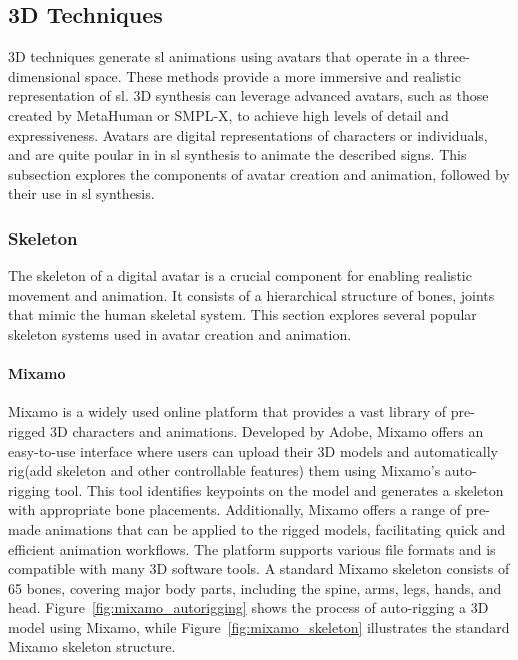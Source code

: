 \documentclass[../../main.tex]{subfiles}
\begin{document}
\subsection{3D Techniques}
\label{ch:background_work:sign_language_synthesis:3d_techniques}

3D techniques generate \gls{sl} animations using avatars that operate in a three-dimensional space. These methods provide a more immersive and realistic representation of \gls{sl}. 3D synthesis can leverage advanced avatars, such as those created by MetaHuman or SMPL-X, to achieve high levels of detail and expressiveness. Avatars are digital representations of characters or individuals, and are quite poular in in \gls{sl} synthesis to animate the described signs. This subsection explores the components of avatar creation and animation, followed by their use in \gls{sl} synthesis.

\subsubsection{Skeleton}
\label{ch:background_work:sign_language_synthesis:3d_techniques:skeleton}

The skeleton of a digital avatar is a crucial component for enabling realistic movement and animation. It consists of a hierarchical structure of bones, joints that mimic the human skeletal system. This section explores several popular skeleton systems used in avatar creation and animation.

\paragraph{Mixamo}
\label{ch:background_work:sign_language_synthesis:3d_techniques:skeleton:mixamo}

Mixamo is a widely used online platform that provides a vast library of pre-rigged 3D characters and animations. Developed by Adobe, Mixamo offers an easy-to-use interface where users can upload their 3D models and automatically rig(add skeleton and other controllable features) them using Mixamo's auto-rigging tool. This tool identifies keypoints on the model and generates a skeleton with appropriate bone placements. Additionally, Mixamo offers a range of pre-made animations that can be applied to the rigged models, facilitating quick and efficient animation workflows. The platform supports various file formats and is compatible with many 3D software tools. A standard Mixamo skeleton consists of 65 bones, covering major body parts, including the spine, arms, legs, hands, and head. Figure~\ref{fig:mixamo_autorigging} shows the process of auto-rigging a 3D model using Mixamo, while Figure~\ref{fig:mixamo_skeleton} illustrates the standard Mixamo skeleton structure.
\end{document}
